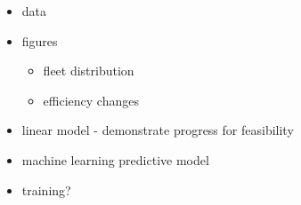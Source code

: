 \documentclass[12pt,letterpaper]{article}
\begin{document}


\begin{itemize}
  \item data
  \item figures
  \begin{itemize}
    \item fleet distribution
    \item efficiency changes
  \end{itemize}
  \item linear model - demonstrate progress for feasibility
  \item machine learning predictive model
  \item training?
\end{itemize}




 \pagebreak
  
\singlespace{

}

 
\end{document}
